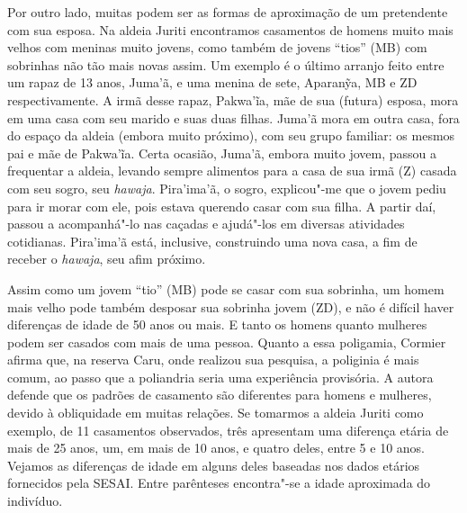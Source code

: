 Por outro lado, muitas podem ser as formas de aproximação de um
pretendente com sua esposa. Na aldeia Juriti encontramos casamentos de
homens muito mais velhos com meninas muito jovens, como também de jovens
``tios'' (MB) com sobrinhas não tão mais novas assim. Um exemplo é o
último arranjo feito entre um rapaz de 13 anos, Juma'ã, e uma menina de
sete, Aparanỹa, MB e ZD respectivamente. A irmã desse rapaz, Pakwa'ĩa,
mãe de sua (futura) esposa, mora em uma casa com seu marido e suas duas
filhas. Juma'ã mora em outra casa, fora do espaço da aldeia (embora
muito próximo), com seu grupo familiar: os mesmos pai e mãe de Pakwa'ĩa.
Certa ocasião, Juma'ã, embora muito jovem, passou a frequentar a aldeia,
levando sempre alimentos para a casa de sua irmã (Z) casada com seu
sogro, seu \emph{hawaja}. Pira'ima'ã, o sogro, explicou"-me que o jovem
pediu para ir morar com ele, pois estava querendo casar com sua filha. A
partir daí, passou a acompanhá"-lo nas caçadas e ajudá"-los em diversas
atividades cotidianas. Pira'ima'ã está, inclusive, construindo uma nova
casa, a fim de receber o \emph{hawaja}, seu afim próximo.

Assim como um jovem ``tio'' (MB) pode se casar com sua sobrinha, um
homem mais velho pode também desposar sua sobrinha jovem (ZD), e não é
difícil haver diferenças de idade de 50 anos ou mais. E tanto os homens
quanto mulheres podem ser casados com mais de uma pessoa. Quanto a essa
poligamia, Cormier afirma que, na reserva Caru, onde realizou sua
pesquisa, a poliginia é mais comum, ao passo que a poliandria seria uma
experiência provisória. A autora defende que os padrões de casamento são
diferentes para homens e mulheres, devido à obliquidade em muitas
relações. Se tomarmos a aldeia Juriti como exemplo, de 11 casamentos
observados, três apresentam uma diferença etária de mais de 25 anos, um,
em mais de 10 anos, e quatro deles, entre 5 e 10 anos. Vejamos as
diferenças de idade em alguns deles baseadas nos dados etários
fornecidos pela SESAI. Entre parênteses encontra"-se a idade aproximada
do indivíduo.


